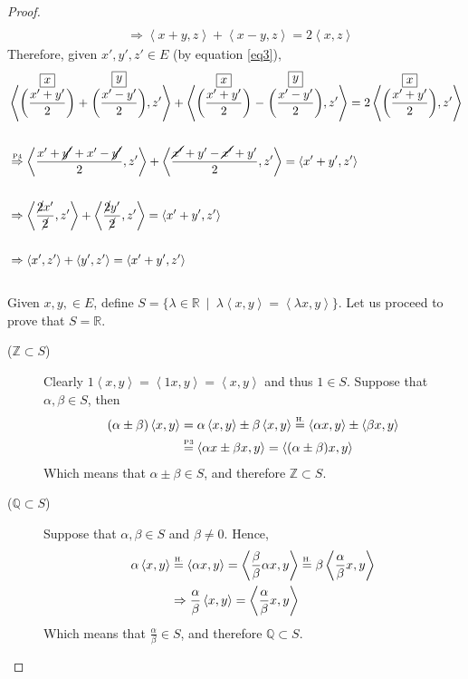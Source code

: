 \documentclass{article}
\newcommand{\Z}{\mathbb{Z}}
\newcommand{\Q}{\mathbb{Q}}
\newcommand{\R}{\mathbb{R}}
\newcommand{\ip}[2]{\left\langle #1, #2\right\rangle}
\newcommand{\comment}[2]{\stackrel{\mathclap{\textnormal{\tiny\mbox{#2}}}}{#1}}
\begin{document}
\begin{proof}
\begin{align}
    \nonumber\\
    &\Rightarrow\ip{x+y}{z} + \ip{x-y}{z} = 2\ip{x}{z}\label{eq3}
  \end{align}
  Therefore, given \(x', y', z' \in E\) (by equation \ref{eq3}),
  \begin{align*}
    &\ip{\comment{\left(\frac{x'+y'}{2}\right)}{\normalsize\fbox{\(x\)}}
    +\comment{\left(\frac{x'-y'}{2}\right)}{\normalsize\fbox{\(y\)}}}{z'}
    +
    \ip{\comment{\left(\frac{x'+y'}{2}\right)}{\normalsize\fbox{\(x\)}}
    -\comment{\left(\frac{x'-y'}{2}\right)}{\normalsize\fbox{\(y\)}}}{z'}
    =
    2\ip{\comment{\left(\frac{x'+y'}{2}\right)}{\normalsize\fbox{\(x\)}}}{z'}
    \\\\
    &\comment{\Rightarrow}{P4}\ip{\frac{x'+\cancel{y'}+x'-\cancel{y'}}{2}}{z'} +
    \ip{\frac{\cancel{x'}+y'-\cancel{x'}+y'}{2}}{z'} = \ip{x'+y'}{z'}
    \\\\
    &\Rightarrow\ip{\frac{\cancel{2}x'}{\cancel{2}}}{z'} +
    \ip{\frac{\cancel{2}y'}{\cancel{2}}}{z'} = \ip{x'+y'}{z'}
    \\\\
    &\Rightarrow\ip{x'}{z'} + \ip{y'}{z'} = \ip{x'+y'}{z'}
  \end{align*}
  \\
   Given \(x, y, \in E\), define \(S = \{\lambda \in \R
  \enspace | \enspace \lambda\ip{x}{y} = \ip{\lambda x}{y}\}\).  Let
  us proceed to prove that \(S = \R\).
  \begin{description}

  \item[(\(\Z \subset S\))] Clearly \(1\ip{x}{y}=\ip{1x}{y}=\ip{x}{y}\) and thus
    \(1 \in S\).  Suppose that \(\alpha, \beta \in S\), then
    \begin{align*}
      (\alpha\pm\beta)\ip{x}{y} &= \alpha\ip{x}{y}\pm\beta\ip{x}{y}
        \comment{=}{H.} \ip{\alpha x}{y}\pm\ip{\beta x}{y} \\
      & \comment{=}{P3} \ip{\alpha x \pm \beta x}{y}
        = \ip{(\alpha\pm\beta)x}{y}
    \end{align*}
    Which means that \(\alpha\pm\beta\in S\), and therefore \(\Z \subset S\).

  \item[(\(\Q \subset S\))] Suppose that \(\alpha, \beta \in S\) and
    \(\beta \neq 0\). Hence,
    \begin{align*}
      \alpha\ip{x}{y} &\comment{=}{H.} \ip{\alpha x}{y} =
      \ip{\frac{\beta}{\beta}\alpha x}{y}
      \comment{=}{H.} \beta\ip{\frac{\alpha}{\beta}x}{y} \\
      &\Rightarrow \frac{\alpha}{\beta}\ip{x}{y} = \ip{\frac{\alpha}{\beta}x}{y}
    \end{align*}
    Which means that \(\frac{\alpha}{\beta} \in S\), and therefore \(\Q
    \subset S\).


\end{description}
\end{proof}
\end{document}
